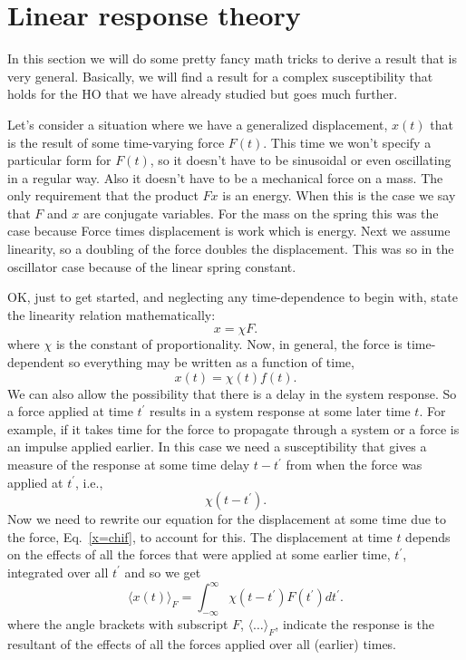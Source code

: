 \documentclass[]{revtex4}
\newcommand{\sm}[1]{{\[#1\]}}
\begin{document}
\section*{Linear response theory}
In this section we will do some pretty fancy math tricks to derive a result that is very general.  Basically, we will find
a result for a complex susceptibility that holds for the HO that we have already studied but goes much further.

Let's consider a situation where we have a generalized displacement, $x(t)$ that is the result of some time-varying force $F(t)$.  This time we won't
specify a particular form for $F(t)$, so it doesn't have to be sinusoidal or even oscillating in a regular way.  Also
it doesn't have to be a mechanical force on a mass.  The only requirement that the product $Fx$ is an energy.  When
this is the case we say that $F$ and $x$ are conjugate variables.  For the mass on the spring this was the case because Force times displacement
is work which is energy.  Next we assume linearity, so a doubling of the force doubles the displacement.  This was so in the
oscillator case because of the linear spring constant.

OK, just to get started, and neglecting any time-dependence to begin with, state the linearity relation mathematically:
\sm{x = \chi F.}
where $\chi$ is the constant of proportionality.  Now, in general, the force is time-dependent so everything may be written as a function
of time,
\sm{x(t) = \chi (t) f(t).\label{x=chif}}
We can also allow the possibility that there is a delay in the system response.  So a force applied at time $t^\prime$ results in a
system response at some later time $t$.  For example, if it takes time for the force to propagate through a system or a force is an
impulse applied earlier.  In this case we
need a susceptibility that gives a measure of the response at some time delay $t-t^\prime$ from when the force was applied at $t^\prime$,
i.e.,
\sm{\chi (t-t^\prime).}
Now we need to rewrite our equation for the displacement at some time
due to the force, Eq.~\ref{x=chif}, to account for this. The displacement at time $t$
depends on the effects of all the forces that were applied at some earlier time, $t^\prime$, integrated over all $t^\prime$ and so we get
\sm{\langle x(t)\rangle_F = \int_{-\infty}^{\infty} \chi(t-t^\prime)F(t^\prime)dt^\prime .\label{xtAverage}}
where the angle brackets with subscript $F$, $\langle\ldots\rangle_F$, indicate the response is the resultant of the effects
of all the forces applied over all (earlier) times.
\end{document}

